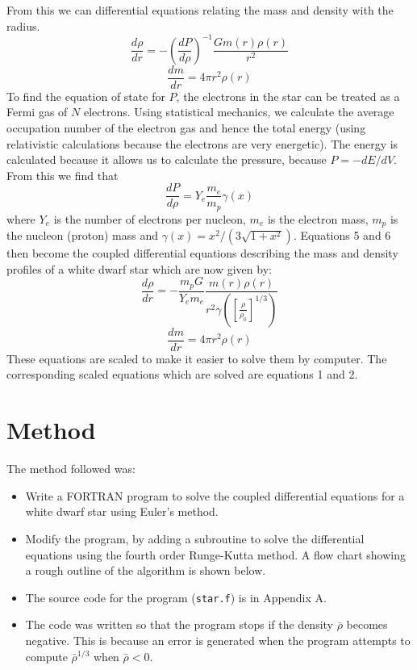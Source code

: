 \documentclass[a4paper]{IEEEtran}
\begin{document}
From this we can differential equations relating the mass and density
with the radius.
\begin{equation}
    \frac{d\rho}{dr} = -\left(\frac{dP}{d\rho}\right)^{-1}\frac{Gm(r)\rho(r)}{r^2}
\end{equation}
\begin{equation}
    \frac{dm}{dr} = 4\pi r^2 \rho(r)
\end{equation}
To find the equation of state for $P$, the electrons in the star can
be treated as a Fermi gas of $N$ electrons. Using statistical mechanics,
we calculate the average occupation number of the electron gas and hence
the total energy (using relativistic calculations because the electrons
are very energetic). The energy is calculated because it allows us to
calculate the pressure, because $P = -dE/dV$.
From this we find that
\begin{equation}
    \frac{dP}{d\rho} = Y_e \frac{m_e}{m_p} \gamma(x)
\end{equation}
where $Y_e$ is the number of electrons per nucleon, $m_e$ is the electron
mass, $m_p$ is the nucleon (proton) mass and $\gamma(x) = x^2/(3\sqrt{1+x^2})$.
Equations 5 and 6 then become the coupled differential equations describing the
mass and density profiles of a white dwarf star which are now given by:
\begin{equation}
    \frac{d\rho}{dr} = -\frac{m_p G}{Y_e m_e} %
                        \frac{m(r)\rho(r)}{r^2 \gamma([ \frac{\rho}{\rho_0}]^{1/3}) }
\end{equation}
\begin{equation}
    \frac{dm}{dr} = 4\pi r^2 \rho(r)
\end{equation}
These equations are scaled to make it easier to solve them by computer. 
The corresponding scaled equations which are solved are equations 1 and 2.




\section{Method}
    The method followed was:
    \begin{itemize}
        \item Write a FORTRAN program to solve the 
              coupled differential equations for a white
              dwarf star using Euler's method.
        \item Modify the program, by adding a subroutine to solve
              the differential equations using the fourth order 
              Runge-Kutta method. A flow chart showing a rough outline
              of the algorithm is shown below.
        \item The source code for the program (\texttt{star.f}) is
              in Appendix A.
        \item The code was written so that the program stops if
              the density $\bar{\rho}$ becomes negative. This is
              because an error is generated when the program attempts
              to compute $\bar{\rho}^{1/3}$ when $\bar{\rho} < 0$. 
    \end{itemize}
\end{document}
